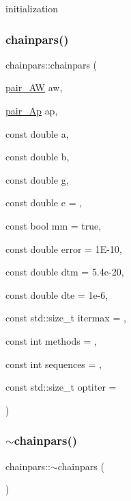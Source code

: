 initialization 

\hypertarget{classchainpars_a7d25bebe5a1facfc2d4cff38b17ef2d4}{}\label{classchainpars_a7d25bebe5a1facfc2d4cff38b17ef2d4} 
\subsubsection{\texorpdfstring{chainpars()}{chainpars()}\hspace{0.1cm}{\footnotesize\ttfamily [2/2]}}
{\footnotesize\ttfamily chainpars\+::chainpars (\begin{DoxyParamCaption}\item[{\hyperlink{AR_8h_a0b1ff9eb7f37c90dc26918b4ec3a829d}{pair\+\_\+\+AW}}]{aw,  }\item[{\hyperlink{AR_8h_a9ba933d6e3fcd6363bc2e7eb341e1f5d}{pair\+\_\+\+Ap}}]{ap,  }\item[{const double}]{a,  }\item[{const double}]{b,  }\item[{const double}]{g,  }\item[{const double}]{e = {},  }\item[{const bool}]{mm = {\ttfamily true},  }\item[{const double}]{error = {\ttfamily 1E-\/10},  }\item[{const double}]{dtm = {\ttfamily 5.4e-\/20},  }\item[{const double}]{dte = {\ttfamily 1e-\/6},  }\item[{const std\+::size\+\_\+t}]{itermax = {},  }\item[{const int}]{methods = {},  }\item[{const int}]{sequences = {},  }\item[{const std\+::size\+\_\+t}]{optiter = {} }\end{DoxyParamCaption})\hspace{0.3cm}{\ttfamily [inline]}}

\hypertarget{classchainpars_a5477732462d570fcf179599f96c5b97f}{}\label{classchainpars_a5477732462d570fcf179599f96c5b97f} 
\subsubsection{\texorpdfstring{$\sim$chainpars()}{~chainpars()}}
{\footnotesize\ttfamily chainpars\+::$\sim$chainpars (\begin{DoxyParamCaption}{ }\end{DoxyParamCaption})\hspace{0.3cm}{\ttfamily [inline]}}



